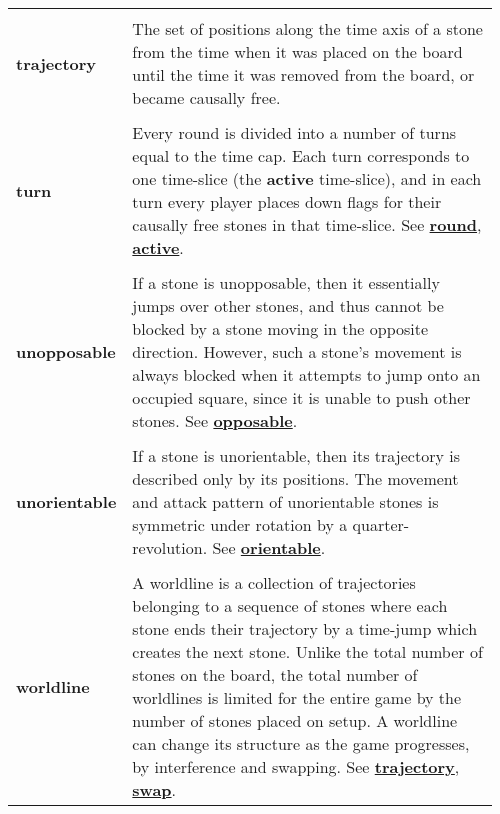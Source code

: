 {\begin{longtable}{ R{0.15\linewidth}  L{0.81\linewidth}  }
 \\* \textbf{trajectory} & \parbox[t]{\linewidth}{The set of positions along the time axis of a stone from the time when it was placed on the board until the time it was removed from the board, or became causally free.}\\
 \\* \textbf{turn} & \parbox[t]{\linewidth}{Every round is divided into a number of turns equal to the time cap. Each turn corresponds to one time-slice (the \textbf{active} time-slice), and in each turn every player places down flags for their causally free stones in that time-slice. See \hyperref[glossary:round]{\textbf{round}}, \hyperref[glossary:active]{\textbf{active}}.}\\
 \\* \textbf{unopposable} & \parbox[t]{\linewidth}{If a stone is unopposable, then it essentially jumps over other stones, and thus cannot be blocked by a stone moving in the opposite direction. However, such a stone's movement is always blocked when it attempts to jump onto an occupied square, since it is unable to push other stones. See \hyperref[glossary:opposable]{\textbf{opposable}}.}\\
 \\* \textbf{unorientable} & \parbox[t]{\linewidth}{If a stone is unorientable, then its trajectory is described only by its positions. The movement and attack pattern of unorientable stones is symmetric under rotation by a quarter-revolution. See \hyperref[glossary:orientable]{\textbf{orientable}}.}\\
 \\* \textbf{worldline} & \parbox[t]{\linewidth}{A worldline is a collection of trajectories belonging to a sequence of stones where each stone ends their trajectory by a time-jump which creates the next stone. Unlike the total number of stones on the board, the total number of worldlines is limited for the entire game by the number of stones placed on setup. A worldline can change its structure as the game progresses, by interference and swapping. See \hyperref[glossary:trajectory]{\textbf{trajectory}}, \hyperref[glossary:swap]{\textbf{swap}}.}


\end{longtable}}